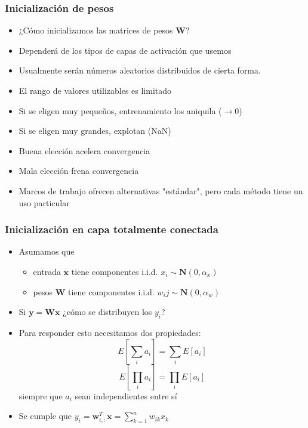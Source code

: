\documentclass[svgnames,12pt,aspectratio=149]{beamer}
\begin{document}
\begin{frame}
  \frametitle{Inicialización de pesos}
\begin{itemize}
\item ¿Cómo inicializamos las matrices de pesos $\boldsymbol{W}$?

\item Dependerá de los tipos de capas de activación que usemos
\item Usualmente serán números aleatorios distribuidos de cierta forma.
\item El rango de valores utilizables es limitado
\item Si se eligen muy pequeños, entrenamiento los aniquila ($\rightarrow 0$)
\item Si se eligen muy grandes, explotan (NaN)
\item Buena elección acelera convergencia
\item Mala elección frena convergencia 
\item Marcos de trabajo ofrecen alternativas "estándar", pero cada método tiene un uso particular    
\end{itemize}
  
\end{frame}
\begin{frame}
  \frametitle{Inicialización en capa totalmente conectada}
\begin{itemize}
\item Asumamos que 
\begin{itemize}
\item entrada $\boldsymbol{x}$ tiene componentes i.i.d. $x_i \sim \mathbf{N}(0,\alpha_x)$
\item pesos $\boldsymbol{W}$ tiene componentes i.i.d. $w_ij \sim \mathbf{N}(0,\alpha_w)$
\end{itemize}
\item Si $\boldsymbol{y}=\boldsymbol{W}\boldsymbol{x} $ ¿cómo se distribuyen los $y_i$?
\item Para responder esto necesitamos dos propiedades: 
\begin{equation*}
E\left[ \sum_{i} a_{i}  \right] =\sum_i E \left[ a_{i}  \right]
\end{equation*}
\begin{equation*}
E\left[ \prod_{i} a_{i}  \right] =\prod_i E \left[ a_{i}  \right]
\end{equation*} siempre que $a_i$ sean independientes entre sí 
\item Se cumple que $y_i=\boldsymbol{w}_{i,:}^T\boldsymbol{x}=\sum_{k=1}^{n} w_{ik}x_k$
\end{itemize}
\end{frame}
\end{document}
